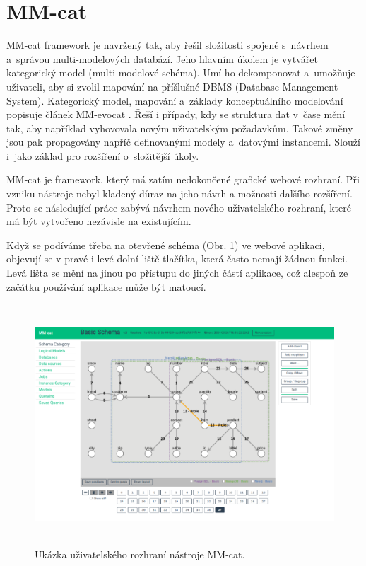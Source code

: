 \section{MM-cat}
MM-cat framework je navržený tak, aby řešil složitosti spojené s~návrhem a~správou multi-modelových databází. Jeho hlavním úkolem je vytvářet kategorický model (multi-modelové schéma). Umí ho dekomponovat a~umožňuje uživateli, aby si zvolil mapování na příšlušné DBMS (Database Management System). Kategorický model, mapování a~základy konceptuálního modelování popisuje článek MM-evocat \cite{MM_evocat}. Řeší i případy, kdy se struktura dat v~čase mění tak, aby například vyhovovala novým uživatelským požadavkům. Takové změny jsou pak propagovány napříč definovanými modely a~datovými instancemi. Slouží i~jako základ pro rozšíření o~složitější úkoly. 

MM-cat je framework, který má zatím nedokončené grafické webové rozhraní. Při vzniku nástroje nebyl kladený důraz na jeho návrh a možnosti dalšího rozšíření. Proto se následující práce zabývá návrhem nového uživatelského rozhraní, které má být vytvořeno nezávisle na existujícím. 

Když se podíváme třeba na otevřené schéma (Obr. \ref{obr01:mm-cat}) ve webové aplikaci, objevují se v pravé i levé dolní liště tlačítka, která často nemají žádnou funkci. Levá lišta se mění na jinou po přístupu do jiných částí aplikace, což alespoň ze začátku používání aplikace může být matoucí.

\begin{figure}[htb]
  \centering
  \includegraphics[height=90mm]{../img/mm-cat}
  \caption{Ukázka uživatelského rozhraní nástroje MM-cat.}
  \label{obr01:mm-cat}
\end{figure}

